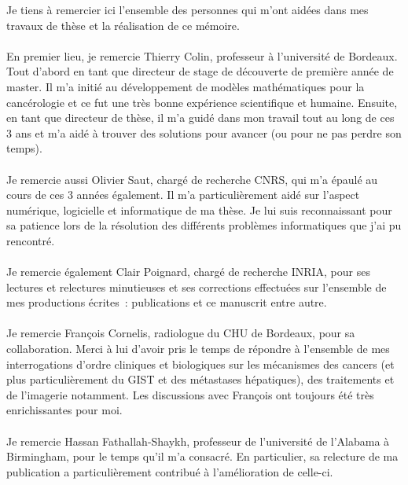 Je tiens à remercier ici  l'ensemble des personnes qui m'ont aidées dans mes travaux de thèse et la réalisation de ce mémoire.

\paragraph{}
En premier lieu, je remercie Thierry Colin, professeur à l'université de Bordeaux. Tout d'abord en tant que directeur de stage de découverte de première année de master. Il m'a initié au développement de modèles mathématiques pour la cancérologie et ce fut une très bonne expérience scientifique et humaine. Ensuite, en tant que directeur de thèse, il m'a guidé dans mon travail tout au long de ces 3 ans et m'a aidé à trouver des solutions pour avancer (ou pour ne pas perdre son temps). 

\paragraph{}
Je remercie aussi Olivier Saut, chargé de recherche CNRS, qui m'a épaulé au cours de ces 3 années également. Il m'a particulièrement aidé sur l'aspect numérique, logicielle et informatique de ma thèse. Je lui suis reconnaissant pour sa patience lors de la résolution des différents problèmes informatiques que j'ai pu rencontré. 

\paragraph{}
Je remercie également Clair Poignard, chargé de recherche INRIA, pour ses lectures et relectures minutieuses et ses corrections effectuées sur l'ensemble de mes productions écrites~: publications et ce manuscrit entre autre.

\paragraph{}
Je remercie François Cornelis, radiologue du CHU de Bordeaux, pour sa collaboration. Merci à lui d'avoir pris le temps de répondre à l'ensemble de mes interrogations d'ordre cliniques et biologiques sur les mécanismes des cancers (et plus particulièrement du GIST et des métastases hépatiques), des traitements et de l'imagerie notamment. Les discussions avec François ont toujours été très enrichissantes pour moi. 

\paragraph{}
Je remercie Hassan Fathallah-Shaykh, professeur de l'université de l'Alabama à Birmingham, pour le temps qu'il m'a consacré. En particulier, sa relecture de ma publication a particulièrement contribué  à l'amélioration de celle-ci.


